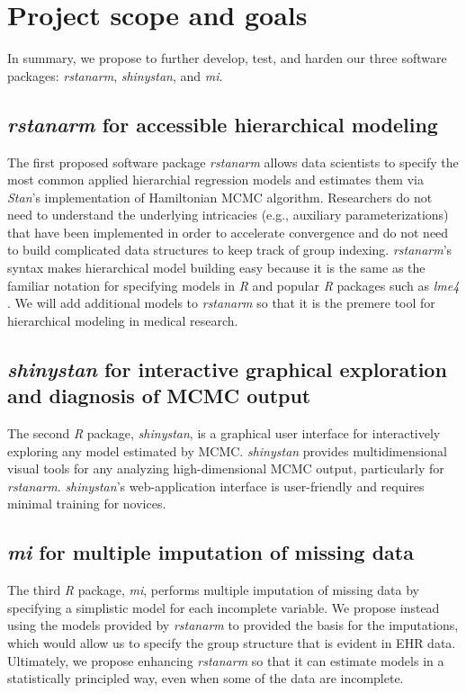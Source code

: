 \documentclass[11pt,notitlepage]{article}
\begin{document}
\section*{Project scope and goals}

In summary, we propose to further develop, test, and harden our three software packages: \textit{rstanarm}, \textit{shinystan}, and \textit{mi}.

\subsection*{\textit{rstanarm} for accessible hierarchical modeling}
The first proposed software package \textit{rstanarm} allows data scientists to specify the most common applied hierarchial regression models 
and estimates them via \textit{Stan}'s implementation of Hamiltonian MCMC algorithm. Researchers do not
need to understand the underlying intricacies (e.g., auxiliary parameterizations) that have been implemented in order to accelerate convergence and 
do not need to build complicated data structures to keep track of group indexing. \textit{rstanarm}'s syntax makes hierarchical model building easy
because it is the same as the familiar notation for specifying models in \textit{R} and popular \textit{R} packages such as \textit{lme4} \cite{lme4}.
We will add additional models to \textit{rstanarm} so that it is the premere tool for hierarchical modeling in medical research.

\subsection*{\textit{shinystan} for interactive graphical exploration and diagnosis of MCMC output}  
The second \textit{R} package, \textit{shinystan}, is a graphical user interface for interactively exploring any model estimated by MCMC. 
\textit{shinystan} provides multidimensional visual tools for any analyzing high-dimensional MCMC output, particularly for 
\textit{rstanarm}. \textit{shinystan}'s web-application interface is user-friendly and requires minimal training for novices.

\subsection*{\textit{mi} for multiple imputation of missing data}
The third \textit{R} package, \textit{mi}, performs multiple imputation of missing data by specifying a simplistic model 
for each incomplete variable. We propose instead using the models provided by \textit{rstanarm} to provided the basis for
the imputations, which would allow us to specify the group structure that is evident in EHR data. Ultimately, we 
propose enhancing \textit{rstanarm} so that it can estimate models in a statistically principled way, even when some of
the data are incomplete.
\end{document}
